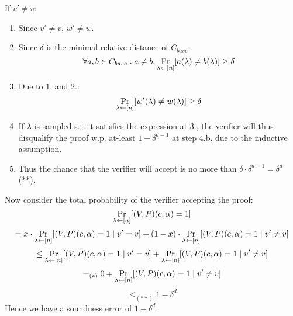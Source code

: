 \begin{itemize}
        If $v'\neq v$:
        \begin{enumerate}
            \item Since $v'\neq v$, $w'\neq w$.
            \item Since $\delta$ is the minimal relative distance of $C_{base}$:
                \[
                    \forall a,b\in C_{base}: a\neq b,
                    \operatorname*{Pr}_{\lambda\leftarrow [n]}[a(\lambda)\neq b(\lambda)]\geq\delta
                \]
            \item Due to 1. and 2.:
                \[
                    \operatorname*{Pr}_{\lambda\leftarrow [n]}[w'(\lambda)\neq w(\lambda)]\geq\delta
                \]
            \item If $\lambda$ is sampled s.t. it satisfies the expression at 3., the verifier will thus disqualify the proof w.p.
            at-least $1-\delta^{d-1}$ at step 4.b. due to the inductive assumption.
            \item Thus the chance that the verifier will accept is no more than $\delta\cdot \delta^{d-1}=\delta^d$ (**).
        \end{enumerate}

        Now consider the total probability of the verifier accepting the proof:
        \[
            \operatorname*{Pr}_{\lambda\leftarrow[n]}[(V,P)(c,\alpha)=1]
        \]\[
            = x\cdot\operatorname*{Pr}_{\lambda\leftarrow[n]}[(V,P)(c,\alpha)=1\mid v'=v]
                +(1-x)\cdot\operatorname*{Pr}_{\lambda\leftarrow[n]}[(V,P)(c,\alpha)=1\mid v'\neq v]
        \]\[
            \leq \operatorname*{Pr}_{\lambda\leftarrow[n]}[(V,P)(c,\alpha)=1\mid v'=v]
                +\operatorname*{Pr}_{\lambda\leftarrow[n]}[(V,P)(c,\alpha)=1\mid v'\neq v]
        \]\[
            =_{(*)} 0 +\operatorname*{Pr}_{\lambda\leftarrow[n]}[(V,P)(c,\alpha)=1\mid v'\neq v]
        \]\[
            \leq_{(**)} 1-\delta^d
        \]
        Hence we have a soundness error of $1-\delta^d$.
\end{itemize}